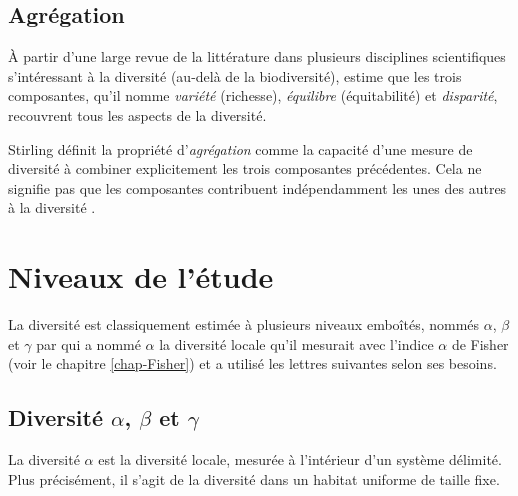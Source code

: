 \documentclass[
  11pt,
  french,
  a4paper,
  extrafontsizes,onecolumn,openright
  ]{memoir}
\begin{document}
\subsection{Agrégation}\label{agruxe9gation}

À partir d'une large revue de la littérature dans plusieurs disciplines scientifiques s'intéressant à la diversité (au-delà de la biodiversité), \textcite{Stirling2007} estime que les trois composantes, qu'il nomme \emph{variété} (richesse), \emph{équilibre} (équitabilité) et \emph{disparité}, recouvrent tous les aspects de la diversité.

Stirling définit la propriété d'\emph{agrégation} comme la capacité d'une mesure de diversité à combiner explicitement les trois composantes précédentes.
Cela ne signifie pas que les composantes contribuent indépendamment les unes des autres à la diversité \autocite{Jost2010}.

\section{Niveaux de l'étude}\label{niveaux-de-luxe9tude}

La diversité est classiquement estimée à plusieurs niveaux emboîtés, nommés \(\alpha\), \(\beta\) et \(\gamma\) par \textcite[page 320]{Whittaker1960} qui a nommé \(\alpha\) la diversité locale qu'il mesurait avec l'indice \(\alpha\) de Fisher (voir le chapitre \ref{chap-Fisher}) et a utilisé les lettres suivantes selon ses besoins.

\subsection{\texorpdfstring{Diversité \(\alpha\), \(\beta\) et \(\gamma\)}{Diversité \textbackslash alpha, \textbackslash beta et \textbackslash gamma}}\label{diversituxe9-alpha-beta-et-gamma}

La diversité \(\alpha\) est la diversité locale, mesurée à l'intérieur d'un système délimité.
Plus précisément, il s'agit de la diversité dans un habitat uniforme de taille fixe.



\scriptsize
\end{document}
